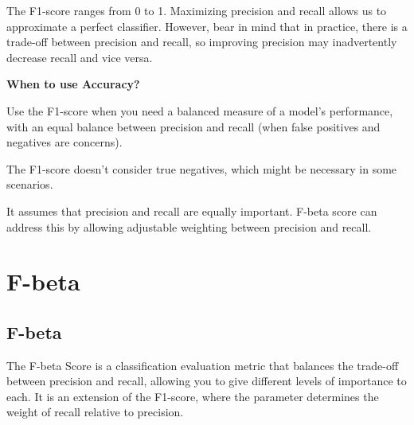 The F1-score ranges from 0 to 1. Maximizing precision and recall allows us to approximate a perfect classifier. However, bear in mind that in practice, there is a
trade-off between precision and recall, so improving precision may inadvertently decrease recall and vice versa.

\textbf{When to use Accuracy?}

Use the F1-score when you need a balanced measure of a model's performance, with an equal balance between precision and recall (when false positives and negatives are concerns).

{
\item The F1-score doesn't consider true negatives, which might be necessary in some scenarios.
\item It assumes that precision and recall are equally important. F-beta score can address this by allowing adjustable weighting between precision and recall.
}

\clearpage
\thispagestyle{classificationstyle}
\section{F-beta}
\subsection{F-beta}

The F-beta Score is a classification evaluation metric that balances the trade-off between precision and recall, allowing you to give different levels of importance to each.
It is an extension of the F1-score, where the parameter  determines the weight of recall relative to precision.

\begin{center}
\end{center}

